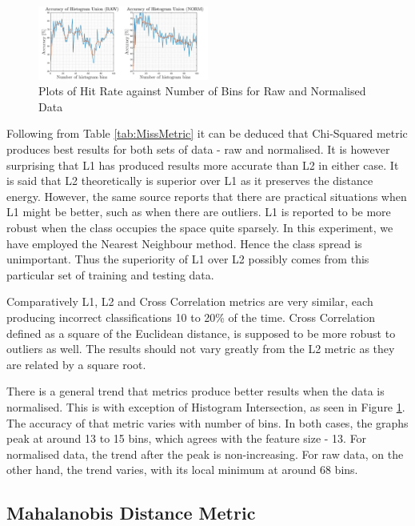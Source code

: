 \documentclass[10pt,twocolumn,letterpaper]{article}
\begin{document}
\begin{figure}[H]
\centering
\includegraphics[width=0.5\textwidth]{../results/Q1D_Hist}
\caption{Plots of Hit Rate against Number of Bins for Raw and Normalised Data
\label{fig:hist}}
\end{figure}

Following from Table \ref{tab:MissMetric} it can be deduced that Chi-Squared metric produces best results for both sets of data - raw and normalised. It is however surprising that L1 has produced results more accurate than L2 in either case. It is said \cite{L1L2} that L2 theoretically is superior over L1 as it preserves the distance energy. However, the same source reports that there are practical situations when L1 might be better, such as when there are outliers. L1 is reported to be more robust when the class occupies the space quite sparsely. In this experiment, we have employed the Nearest Neighbour method. Hence the class spread is unimportant. Thus the superiority of L1 over L2 possibly comes from this particular set of training and testing data.

Comparatively L1, L2 and Cross Correlation metrics are very similar, each producing incorrect classifications 10 to 20\% of the time. Cross Correlation defined as a square of the Euclidean distance, is supposed to be more robust to outliers as well. The results should not vary greatly from the L2 metric as they are related by a square root. 

There is a general trend that metrics produce better results when the data is normalised. This is with exception of Histogram Intersection, as seen in Figure \ref{fig:hist}. The accuracy of that metric varies with number of bins. In both cases, the graphs peak at around 13 to 15 bins, which agrees with the feature size - 13. For normalised data, the trend after the peak is non-increasing. For raw data, on the other hand, the trend varies, with its local minimum at around 68 bins. 

\subsection{Mahalanobis Distance Metric}
\end{document}
